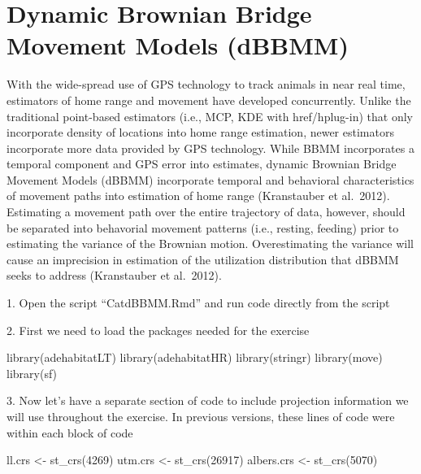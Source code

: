 \documentclass[
  letterpaper,
]{book}
\newenvironment{Shaded}{\begin{snugshade}}{\end{snugshade}}
\newcommand{\DecValTok}[1]{\textcolor[rgb]{0.68,0.00,0.00}{#1}}
\newcommand{\FunctionTok}[1]{\textcolor[rgb]{0.28,0.35,0.67}{#1}}
\newcommand{\NormalTok}[1]{\textcolor[rgb]{0.00,0.23,0.31}{#1}}
\newcommand{\OtherTok}[1]{\textcolor[rgb]{0.00,0.23,0.31}{#1}}
\begin{document}
\hypertarget{dynamic-brownian-bridge-movement-models-dbbmm}{%
\chapter{Dynamic Brownian Bridge Movement Models
(dBBMM)}\label{dynamic-brownian-bridge-movement-models-dbbmm}}

With the wide-spread use of GPS technology to track animals in near real
time, estimators of home range and movement have developed concurrently.
Unlike the traditional point-based estimators (i.e., MCP, KDE with
href/hplug-in) that only incorporate density of locations into home
range estimation, newer estimators incorporate more data provided by GPS
technology. While BBMM incorporates a temporal component and GPS error
into estimates, dynamic Brownian Bridge Movement Models (dBBMM)
incorporate temporal and behavioral characteristics of movement paths
into estimation of home range (Kranstauber et al.~2012). Estimating a
movement path over the entire trajectory of data, however, should be
separated into behavorial movement patterns (i.e., resting, feeding)
prior to estimating the variance of the Brownian motion. Overestimating
the variance will cause an imprecision in estimation of the utilization
distribution that dBBMM seeks to address (Kranstauber et al.~2012).

1. Open the script ``CatdBBMM.Rmd'' and run code directly from the
script

2. First we need to load the packages needed for the exercise

\begin{Shaded}
\begin{Highlighting}[]
\FunctionTok{library}\NormalTok{(adehabitatLT)}
\FunctionTok{library}\NormalTok{(adehabitatHR)}
\FunctionTok{library}\NormalTok{(stringr)}
\FunctionTok{library}\NormalTok{(move)}
\FunctionTok{library}\NormalTok{(sf)}
\end{Highlighting}
\end{Shaded}

3. Now let's have a separate section of code to include projection
information we will use throughout the exercise. In previous versions,
these lines of code were within each block of code

\begin{Shaded}
\begin{Highlighting}[]
\NormalTok{ll.crs }\OtherTok{\textless{}{-}} \FunctionTok{st\_crs}\NormalTok{(}\DecValTok{4269}\NormalTok{)}
\NormalTok{utm.crs }\OtherTok{\textless{}{-}} \FunctionTok{st\_crs}\NormalTok{(}\DecValTok{26917}\NormalTok{)}
\NormalTok{albers.crs }\OtherTok{\textless{}{-}} \FunctionTok{st\_crs}\NormalTok{(}\DecValTok{5070}\NormalTok{)}
\end{Highlighting}
\end{Shaded}
\end{document}
